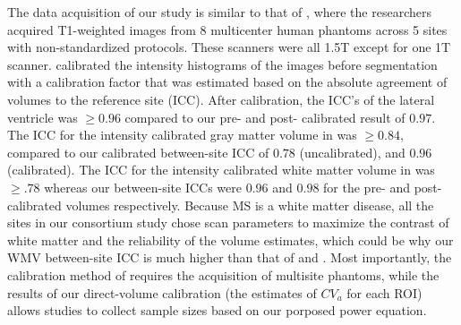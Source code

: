 The data acquisition of our study is similar to that of \cite{Schnack_2004}, where the researchers acquired T1-weighted images from 8 multicenter human phantoms across 5 sites with non-standardized protocols. These scanners were all 1.5T except for one 1T scanner. \cite{Schnack_2004} calibrated the intensity histograms of the images before segmentation with a calibration factor that was estimated based on the absolute agreement of volumes to the reference site (ICC). After calibration, the ICC's of the lateral ventricle was $\geq 0.96$ compared to our pre- and post- calibrated result of $0.97$. The ICC for the intensity calibrated gray matter volume in \cite{Schnack_2004} was $\geq 0.84$, compared to our calibrated between-site ICC of $0.78$ (uncalibrated), and $0.96$ (calibrated). The ICC for the intensity calibrated  white matter volume in \cite{Schnack_2004} was $\geq .78$ whereas our between-site ICCs were $0.96$ and $0.98$ for the pre- and post- calibrated volumes respectively. Because MS is a white matter disease, all the sites in our consortium study chose scan parameters to maximize the contrast of white matter and the reliability of the volume estimates, which could be why our WMV between-site ICC is much higher than that of \cite{Schnack_2004} and \cite{cannon2014}. Most importantly, the calibration method of \cite{Schnack_2004} requires the acquisition of multisite phantoms, while the results of our direct-volume calibration (the estimates of $CV_a$ for each ROI) allows studies to collect sample sizes based on our  porposed power equation. 